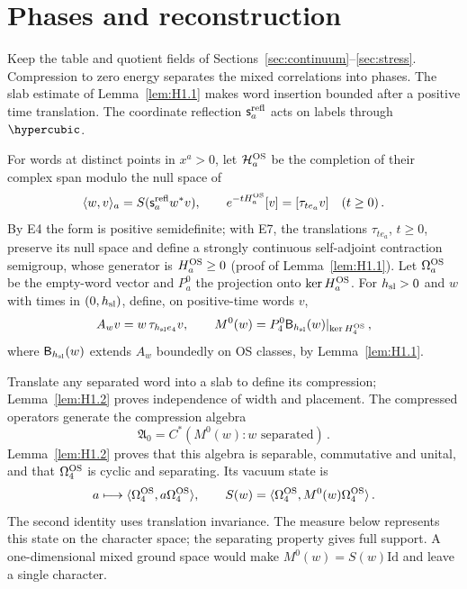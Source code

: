 \section{Phases and reconstruction}\label{sec:phases}

Keep the table and quotient fields of Sections~\ref{sec:continuum}--\ref{sec:stress}. Compression to zero energy separates the mixed correlations into phases. The slab estimate of Lemma~\ref{lem:H1.1} makes word insertion bounded after a positive time translation. The coordinate reflection $\mathsf s_a^{\rm refl}$ acts on labels through $\hypercubic$.

\begin{definition}\label{def:D14}
For words at distinct points in $x^a>0$, let $\mathcal H_a^{\rm OS}$ be the completion of their complex span modulo the null space of
\begin{equation*}
\langle w,v\rangle_a=S(\mathsf s_a^{\rm refl}w^*v),\qquad e^{-tH_a^{\rm OS}}[v]=[\tau_{te_a}v]\quad(t\ge0)\,.
\end{equation*}
By E4 the form is positive semidefinite; with E7, the translations $\tau_{te_a}$, $t\ge0$, preserve its null space and define a strongly continuous self-adjoint contraction semigroup, whose generator is $H_a^{\rm OS}\ge0$ (proof of Lemma~\ref{lem:H1.1}).
Let $\Omega_a^{\rm OS}$ be the empty-word vector and $P^0_a$ the projection onto $\ker H_a^{\rm OS}$. For $h_{\rm sl}>0$ and $w$ with times in $(0,h_{\rm sl})$, define, on positive-time words $v$,
\begin{equation*}
A_wv=w\,\tau_{h_{\rm sl}e_4}v,\qquad M^0(w)=P^0_4\mathsf B_{h_{\rm sl}}(w)|_{\ker H_4^{\rm OS}}\,,
\end{equation*}
where $\mathsf B_{h_{\rm sl}}(w)$ extends $A_w$ boundedly on OS classes, by Lemma~\ref{lem:H1.1}.
\end{definition}

Translate any separated word into a slab to define its compression; Lemma~\ref{lem:H1.2} proves independence of width and placement. The compressed operators generate the compression algebra
\begin{equation*}
\mathfrak A_0=C^*(M^0(w):w\text{ separated})\,.
\end{equation*}
Lemma~\ref{lem:H1.2} proves that this algebra is separable, commutative and unital, and that $\Omega_4^{\rm OS}$ is cyclic and separating. Its vacuum state is
\begin{equation*}
a\longmapsto\langle\Omega_4^{\rm OS},a\Omega_4^{\rm OS}\rangle,\qquad
S(w)=\langle\Omega_4^{\rm OS},M^0(w)\Omega_4^{\rm OS}\rangle\,.
\end{equation*}
The second identity uses translation invariance. The measure below represents this state on the character space; the separating property gives full support. A one-dimensional mixed ground space would make $M^0(w)=S(w)\mathrm{Id}$ and leave a single character.


